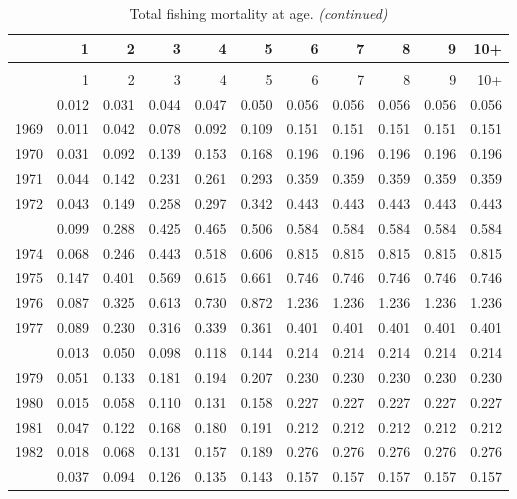 \documentclass[
]{article}
\begin{document}
\begin{longtable}[t]{lrrrrrrrrrr}
\caption{\label{tab:FAA-tot-table}Total fishing mortality at age.}\\
\toprule
  & 1 & 2 & 3 & 4 & 5 & 6 & 7 & 8 & 9 & 10+\\
\midrule
\endfirsthead
\caption[]{Total fishing mortality at age. \textit{(continued)}}\\
\toprule
  & 1 & 2 & 3 & 4 & 5 & 6 & 7 & 8 & 9 & 10+\\
\midrule
\endhead

\endfoot
\bottomrule
\endlastfoot
1968 & 0.012 & 0.031 & 0.044 & 0.047 & 0.050 & 0.056 & 0.056 & 0.056 & 0.056 & 0.056\\
1969 & 0.011 & 0.042 & 0.078 & 0.092 & 0.109 & 0.151 & 0.151 & 0.151 & 0.151 & 0.151\\
1970 & 0.031 & 0.092 & 0.139 & 0.153 & 0.168 & 0.196 & 0.196 & 0.196 & 0.196 & 0.196\\
1971 & 0.044 & 0.142 & 0.231 & 0.261 & 0.293 & 0.359 & 0.359 & 0.359 & 0.359 & 0.359\\
1972 & 0.043 & 0.149 & 0.258 & 0.297 & 0.342 & 0.443 & 0.443 & 0.443 & 0.443 & 0.443\\
\addlinespace
1973 & 0.099 & 0.288 & 0.425 & 0.465 & 0.506 & 0.584 & 0.584 & 0.584 & 0.584 & 0.584\\
1974 & 0.068 & 0.246 & 0.443 & 0.518 & 0.606 & 0.815 & 0.815 & 0.815 & 0.815 & 0.815\\
1975 & 0.147 & 0.401 & 0.569 & 0.615 & 0.661 & 0.746 & 0.746 & 0.746 & 0.746 & 0.746\\
1976 & 0.087 & 0.325 & 0.613 & 0.730 & 0.872 & 1.236 & 1.236 & 1.236 & 1.236 & 1.236\\
1977 & 0.089 & 0.230 & 0.316 & 0.339 & 0.361 & 0.401 & 0.401 & 0.401 & 0.401 & 0.401\\
\addlinespace
1978 & 0.013 & 0.050 & 0.098 & 0.118 & 0.144 & 0.214 & 0.214 & 0.214 & 0.214 & 0.214\\
1979 & 0.051 & 0.133 & 0.181 & 0.194 & 0.207 & 0.230 & 0.230 & 0.230 & 0.230 & 0.230\\
1980 & 0.015 & 0.058 & 0.110 & 0.131 & 0.158 & 0.227 & 0.227 & 0.227 & 0.227 & 0.227\\
1981 & 0.047 & 0.122 & 0.168 & 0.180 & 0.191 & 0.212 & 0.212 & 0.212 & 0.212 & 0.212\\
1982 & 0.018 & 0.068 & 0.131 & 0.157 & 0.189 & 0.276 & 0.276 & 0.276 & 0.276 & 0.276\\
\addlinespace
1983 & 0.037 & 0.094 & 0.126 & 0.135 & 0.143 & 0.157 & 0.157 & 0.157 & 0.157 & 0.157\\

\end{longtable}
\end{document}
